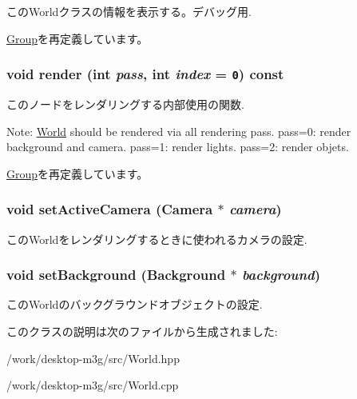 このWorldクラスの情報を表示する。デバッグ用. 

\hyperlink{classm3g_1_1Group_6fea17fa1532df3794f8cb39cb4f911f}{Group}を再定義しています。\hypertarget{classm3g_1_1World_1efcb1973989d9963d5bd6d03065d389}{
\subsubsection[{render}]{\setlength{\rightskip}{0pt plus 5cm}void render (int {\em pass}, \/  int {\em index} = {\tt 0}) const}}
\label{classm3g_1_1World_1efcb1973989d9963d5bd6d03065d389}


このノードをレンダリングする内部使用の関数.

Note: \hyperlink{classm3g_1_1World}{World} should be rendered via all rendering pass. pass=0: render background and camera. pass=1: render lights. pass=2: render objets. 

\hyperlink{classm3g_1_1Group_1efcb1973989d9963d5bd6d03065d389}{Group}を再定義しています。\hypertarget{classm3g_1_1World_dd9a82b335e8521592ad410c662a5cfd}{
\subsubsection[{setActiveCamera}]{\setlength{\rightskip}{0pt plus 5cm}void setActiveCamera ({\bf Camera} $\ast$ {\em camera})}}
\label{classm3g_1_1World_dd9a82b335e8521592ad410c662a5cfd}


このWorldをレンダリングするときに使われるカメラの設定. \hypertarget{classm3g_1_1World_6193765c76d6dc0450f264918ebe7e1c}{
\subsubsection[{setBackground}]{\setlength{\rightskip}{0pt plus 5cm}void setBackground ({\bf Background} $\ast$ {\em background})}}
\label{classm3g_1_1World_6193765c76d6dc0450f264918ebe7e1c}


このWorldのバックグラウンドオブジェクトの設定. 

このクラスの説明は次のファイルから生成されました:\begin{CompactItemize}
\item 
/work/desktop-m3g/src/World.hpp\item 
/work/desktop-m3g/src/World.cpp\end{CompactItemize}
